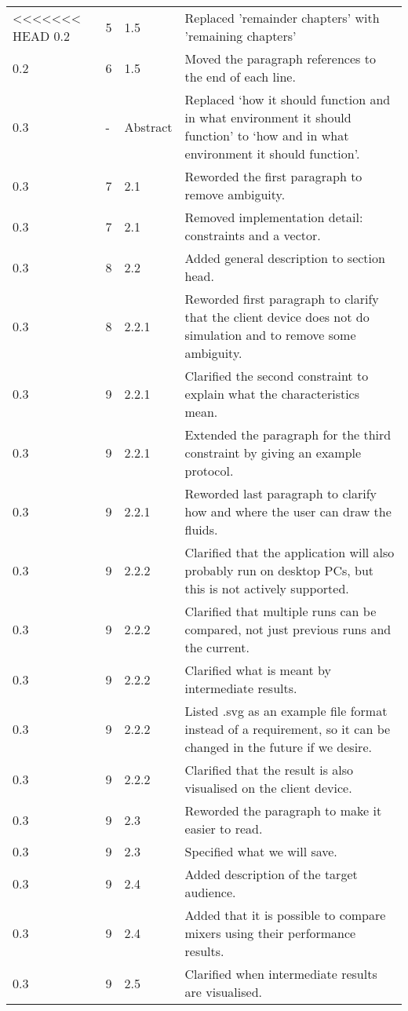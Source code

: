 \begin{tabular}{|l|l|l|p{11cm}|}
<<<<<<< HEAD
    0.2 & 5 & 1.5 & Replaced 'remainder chapters' with 'remaining chapters' \\
    0.2 & 6 & 1.5 & Moved the paragraph references to the end of each line. \\
    0.3 & - & Abstract & Replaced `how it should function and in what environment it should function' to `how and in what environment it should function'.\\
    0.3 & 7 & 2.1 & Reworded the first paragraph to remove ambiguity. \\
    0.3 & 7 & 2.1 & Removed implementation detail: constraints and a vector. \\
    0.3 & 8 & 2.2 & Added general description to section head. \\
    0.3 & 8 & 2.2.1 & Reworded first paragraph to clarify that the client device does not do simulation and to remove some ambiguity. \\
    0.3 & 9 & 2.2.1 & Clarified the second constraint to explain what the characteristics mean. \\
    0.3 & 9 & 2.2.1 & Extended the paragraph for the third constraint by giving an example protocol. \\
    0.3 & 9 & 2.2.1 & Reworded last paragraph to clarify how and where the user can draw the fluids. \\
    0.3 & 9 & 2.2.2 & Clarified that the application will also probably run on desktop PCs, but this is not actively supported. \\
    0.3 & 9 & 2.2.2 & Clarified that multiple runs can be compared, not just previous runs and the current.\\
    0.3 & 9 & 2.2.2 & Clarified what is meant by intermediate results. \\
    0.3 & 9 & 2.2.2 & Listed .svg as an example file format instead of a requirement, so it can be changed in the future if we desire. \\
    0.3 & 9 & 2.2.2 & Clarified that the result is also visualised on the client device. \\
    0.3 & 9 & 2.3 & Reworded the paragraph to make it easier to read. \\
    0.3 & 9 & 2.3 & Specified what we will save. \\
    0.3 & 9 & 2.4 & Added description of the target audience. \\
    0.3 & 9 & 2.4 & Added that it is possible to compare mixers using their performance results. \\
    0.3 & 9 & 2.5 & Clarified when intermediate results are visualised. \\

\end{tabular}
